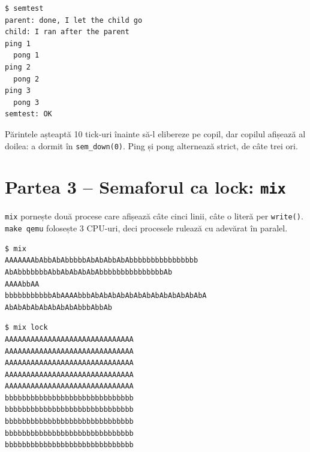 \documentclass[11pt,a4paper]{article}
\begin{document}
\begin{terminal}
\begin{verbatim}
$ semtest
parent: done, I let the child go
child: I ran after the parent
ping 1
  pong 1
ping 2
  pong 2
ping 3
  pong 3
semtest: OK
\end{verbatim}
\end{terminal}
Părintele așteaptă 10 tick-uri înainte să-l elibereze pe copil, dar copilul afișează al doilea: a dormit în
\texttt{sem\_down(0)}. Ping și pong alternează strict, de câte trei ori.

\section{Partea 3 -- Semaforul ca lock: \texttt{mix}}
\texttt{mix} pornește două procese care afișează câte cinci linii, câte o literă per \texttt{write()}. \texttt{make qemu}
folosește 3 CPU-uri, deci procesele rulează cu adevărat în paralel.

\begin{terminal}
\begin{verbatim}
$ mix
AAAAAAAbAbbAbAbbbbbAbAbAbbAbAbbbbbbbbbbbbbbbb
AbAbbbbbbbAbbAbAbAbAbAbbbbbbbbbbbbbbbAb
AAAAbbAA
bbbbbbbbbbbAbAAAAbbbAbAbAbAbAbAbAbAbAbAbAbAbAbA
AbAbAbAbAbAbAbAbAbbbAbbAb
\end{verbatim}
\end{terminal}

\begin{terminal}
\begin{verbatim}
$ mix lock
AAAAAAAAAAAAAAAAAAAAAAAAAAAAAA
AAAAAAAAAAAAAAAAAAAAAAAAAAAAAA
AAAAAAAAAAAAAAAAAAAAAAAAAAAAAA
AAAAAAAAAAAAAAAAAAAAAAAAAAAAAA
AAAAAAAAAAAAAAAAAAAAAAAAAAAAAA
bbbbbbbbbbbbbbbbbbbbbbbbbbbbbb
bbbbbbbbbbbbbbbbbbbbbbbbbbbbbb
bbbbbbbbbbbbbbbbbbbbbbbbbbbbbb
bbbbbbbbbbbbbbbbbbbbbbbbbbbbbb
bbbbbbbbbbbbbbbbbbbbbbbbbbbbbb
\end{verbatim}
\end{terminal}
\end{document}
